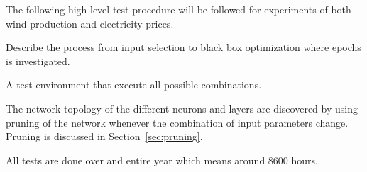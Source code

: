 The following high level test procedure will be followed for experiments of both wind production and electricity prices. 

Describe the process from input selection to black box optimization where epochs is investigated.

A test environment that execute all possible combinations. 

The network topology of the different neurons and layers are discovered by using pruning of the network whenever the combination of input parameters change. Pruning is discussed in Section~\ref{sec:pruning}.

All tests are done over and entire year which means around 8600 hours.

